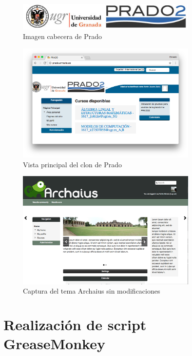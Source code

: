\begin{figure}[H]
\centering
\includegraphics[width=0.8\textwidth]{../screenshots/cabeceraprado}
\caption{Imagen cabecera de Prado}
\label{fig:cabeceraprado}
\end{figure}

\begin{figure}[H]
\centering
\includegraphics[width=0.8\textwidth]{../screenshots/pradoernesto}
\caption{Vista principal del clon de Prado}
\label{fig:pradoernesto}
\end{figure}

\begin{figure}[H]
\centering
\includegraphics[width=0.8\textwidth]{../screenshots/archaius}
\caption{Captura del tema Archaius sin modificaciones}
\label{fig:archaius}
\end{figure}




\section{Realización de script GreaseMonkey}

